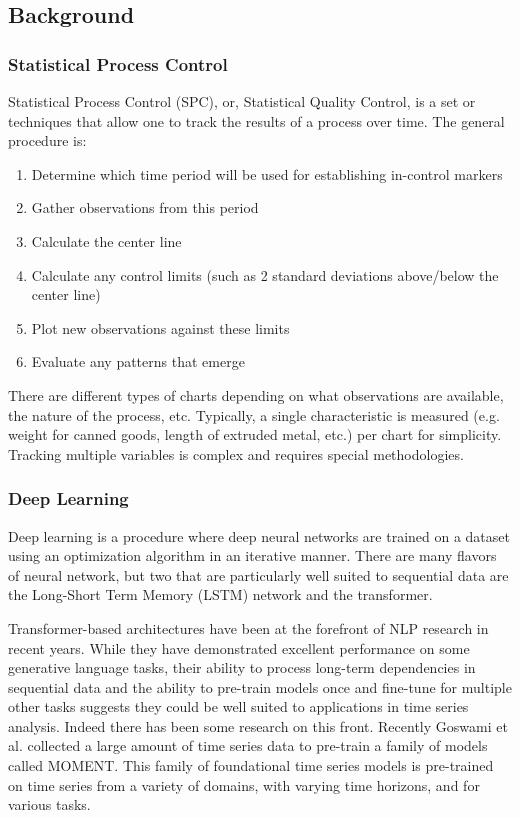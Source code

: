 \documentclass[12pt]{article}
\begin{document}
\subsection{Background} \label{back}

\subsubsection{Statistical Process Control}

Statistical Process Control (SPC), or, Statistical Quality Control, is a set or techniques
that allow one to track the results of a process over time\cite{guthrie_nistsematech_2020}. 
The general procedure is:

\begin{enumerate}
    \item Determine which time period will be used for establishing in-control markers
    \item Gather observations from this period
    \item Calculate the center line
    \item Calculate any control limits (such as 2 standard deviations above/below the center line)
    \item Plot new observations against these limits
    \item Evaluate any patterns that emerge
\end{enumerate}

There are different types of charts depending on what observations are available, the nature
of the process, etc. Typically, a single characteristic is measured (e.g. weight for canned goods,
length of extruded metal, etc.) per chart for simplicity. Tracking multiple variables is
complex and requires special methodologies.

\subsubsection{Deep Learning}
Deep learning is a procedure where deep neural networks are trained on a dataset using an
optimization algorithm in an iterative manner. There are many flavors of neural network, but
two that are particularly well suited to sequential data are the Long-Short Term Memory (LSTM)
network\cite{hochreiter_long_1997} and the transformer\cite{vaswani_attention_2023}.

Transformer-based architectures have been at the forefront of NLP research in recent years. While they have
demonstrated excellent performance on some generative language tasks, their ability to process long-term
dependencies in sequential data and the ability to pre-train models once and fine-tune for multiple other tasks
suggests they could be well suited to applications in time series analysis. Indeed there has been some research
on this front. Recently Goswami et al.\cite{goswami_moment_2024} collected a large amount of time series data
to pre-train a family of models called MOMENT. This family of foundational time series models is pre-trained
on time series from a variety of domains, with varying time horizons, and for various tasks.
\end{document}
